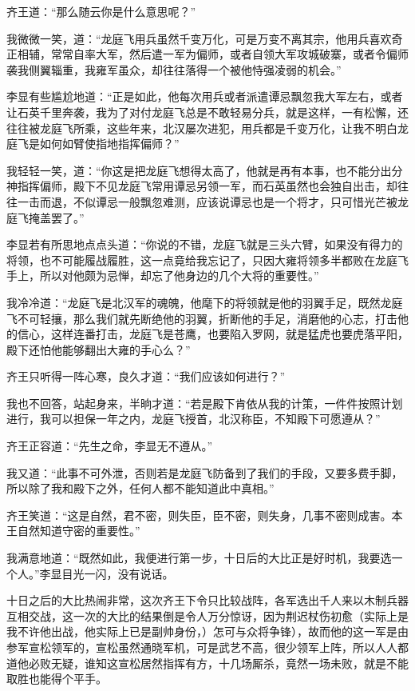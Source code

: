 齐王道：“那么随云你是什么意思呢？”

我微微一笑，道：“龙庭飞用兵虽然千变万化，可是万变不离其宗，他用兵喜欢奇正相辅，常常自率大军，然后遣一军为偏师，或者自领大军攻城破寨，或者令偏师袭我侧翼辎重，我雍军虽众，却往往落得一个被他恃强凌弱的机会。”

李显有些尴尬地道：“正是如此，他每次用兵或者派遣谭忌飘忽我大军左右，或者让石英千里奔袭，我为了对付龙庭飞总是不敢轻易分兵，就是这样，一有松懈，还往往被龙庭飞所乘，这些年来，北汉屡次进犯，用兵都是千变万化，让我不明白龙庭飞是如何如臂使指地指挥偏师？”

我轻轻一笑，道：“你这是把龙庭飞想得太高了，他就是再有本事，也不能分出分神指挥偏师，殿下不见龙庭飞常用谭忌另领一军，而石英虽然也会独自出击，却往往一击而退，不似谭忌一般飘忽难测，应该说谭忌也是一个将才，只可惜光芒被龙庭飞掩盖罢了。”

李显若有所思地点点头道：“你说的不错，龙庭飞就是三头六臂，如果没有得力的将领，也不可能履战履胜，这一点竟给我忘记了，只因大雍将领多半都败在龙庭飞手上，所以对他颇为忌惮，却忘了他身边的几个大将的重要性。”

我冷冷道：“龙庭飞是北汉军的魂魄，他麾下的将领就是他的羽翼手足，既然龙庭飞不可轻攘，那么我们就先断绝他的羽翼，折断他的手足，消磨他的心志，打击他的信心，这样连番打击，龙庭飞是苍鹰，也要陷入罗网，就是猛虎也要虎落平阳，殿下还怕他能够翻出大雍的手心么？”

齐王只听得一阵心寒，良久才道：“我们应该如何进行？”

我也不回答，站起身来，半晌才道：“若是殿下肯依从我的计策，一件件按照计划进行，我可以担保一年之内，龙庭飞授首，北汉称臣，不知殿下可愿遵从？”

齐王正容道：“先生之命，李显无不遵从。”

我又道：“此事不可外泄，否则若是龙庭飞防备到了我们的手段，又要多费手脚，所以除了我和殿下之外，任何人都不能知道此中真相。”

齐王笑道：“这是自然，君不密，则失臣，臣不密，则失身，几事不密则成害。本王自然知道守密的重要性。”

我满意地道：“既然如此，我便进行第一步，十日后的大比正是好时机，我要选一个人。”李显目光一闪，没有说话。

十日之后的大比热闹非常，这次齐王下令只比较战阵，各军选出千人来以木制兵器互相交战，这一次的大比的结果倒是令人万分惊讶，因为荆迟杖伤初愈（实际上是我不许他出战，他实际上已是副帅身份，）怎可与众将争锋），故而他的这一军是由参军宣松领军的，宣松虽然通晓军机，可是武艺不高，很少领军上阵，所以人人都道他必败无疑，谁知这宣松居然指挥有方，十几场厮杀，竟然一场未败，就是不能取胜也能得个平手。

